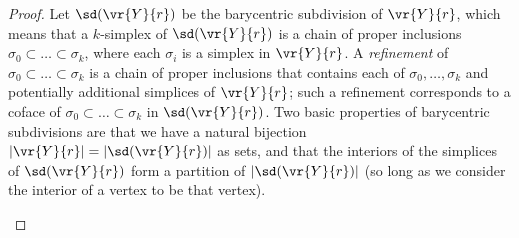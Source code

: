 \documentclass[11pt, reqno, english]{amsart}
\begin{document}
\begin{proof}
Let $\sd(\vr{Y}{r})$ be the barycentric subdivision of $\vr{Y}{r}$, which means that a $k$-simplex of $\sd(\vr{Y}{r})$ is a chain of proper inclusions $\sigma_0 \subset \ldots \subset \sigma_k$, where each $\sigma_i$ is a simplex in $\vr{Y}{r}$.
A \emph{refinement} of $\sigma_0 \subset \ldots \subset \sigma_k$ is a chain of proper inclusions that contains each of $\sigma_0,\ldots,\sigma_k$ and potentially additional simplices of $\vr{Y}{r}$; such a refinement corresponds to a coface of $\sigma_0 \subset \ldots \subset \sigma_k$ in $\sd(\vr{Y}{r})$.
Two basic properties of barycentric subdivisions are that we have a natural bijection $|\vr{Y}{r}|=|\sd(\vr{Y}{r})|$ as sets, and that the interiors of the simplices of $\sd(\vr{Y}{r})$ form a partition of $|\sd(\vr{Y}{r})|$ (so long as we consider the interior of a vertex to be that vertex).

\begin{figure}[htb]
\centering
{}
\end{figure}
\end{proof}
\end{document}
